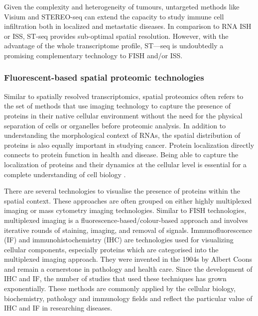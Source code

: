 Given the complexity and heterogeneity of tumours, untargeted methods like Visium and STEREO-seq can extend the capacity to study immune cell infiltration both in localized and metastatic diseases. In comparison to RNA ISH or ISS, ST-seq provides sub-optimal spatial resolution. However, with the advantage of the whole transcriptome profile, ST—seq is undoubtedly a promising complementary technology to FISH and/or ISS.  

\subsubsection{Fluorescent-based spatial proteomic technologies}
Similar to spatially resolved transcriptomics, spatial proteomics often refers to the set of methods that use imaging technology to capture the presence of proteins in their native cellular environment without the need for the physical separation of cells or organelles before proteomic analysis. In addition to understanding the morphological context of RNAs, the spatial distribution of proteins is also equally important in studying cancer. Protein localization directly connects to protein function in health and disease. Being able to capture the localization of proteins and their dynamics at the cellular level is essential for a complete understanding of cell biology \cite{lundberg2019spatial}. 

There are several technologies to visualise the presence of proteins within the spatial context. These approaches are often grouped on either highly multiplexed imaging or mass cytometry imaging technologies. Similar to FISH technologies, multiplexed imaging is a fluorescence-based/colour-based approach and involves iterative rounds of staining, imaging, and removal of signals. Immunofluorescence (IF) and immunohistochemistry (IHC) are technologies used for visualizing cellular components, especially proteins which are categorised into the multiplexed imaging approach. They were invented in the 1904s by Albert Coons \cite{coons1941immunological} and remain a cornerstone in pathology and health care. Since the development of IHC and IF, the number of studies that used these techniques has grown exponentially. These methods are commonly applied by the cellular biology, biochemistry, pathology and immunology fields and reflect the particular value of IHC and IF in researching diseases.        

